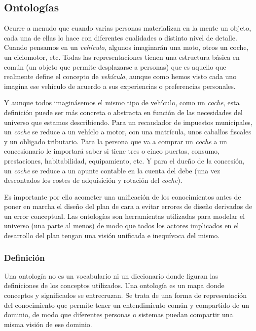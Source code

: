 	\subsection{Ontologías}
  	
	Ocurre a menudo que cuando varias personas materializan en la mente un objeto, cada una de ellas lo hace con diferentes cualidades o distinto nivel de detalle. Cuando pensamos en un \textit{vehículo}, algunos imaginarán una moto, otros un coche, un ciclomotor, etc. Todas las representaciones tienen una estructura básica en común (un objeto que permite desplazarse a personas) que es aquello que realmente define el concepto de \textit{vehículo}, aunque como hemos visto cada uno imagina ese vehículo de acuerdo a sus experiencias o preferencias personales. 
  	
  	Y aunque todos imaginásemos el mismo tipo de vehículo, como un \textit{coche}, esta definición puede ser más concreta o abstracta en función de las necesidades del universo que estamos describiendo. Para un recaudador de impuestos municipales, un \textit{coche} se reduce a un vehíclo a motor, con una matrícula, unos caballos fiscales y un obligado tributario. Para la persona que va a comprar un \textit{coche} a un concesionario le importará saber si tiene tres o cinco puertas, consumo, prestaciones, habitabilidad, equipamiento, etc. Y para el dueño de la concesión, un \textit{coche} se reduce a un apunte contable en la cuenta del debe (una vez descontados los costes de adquisición y rotación del \textit{coche}).
  	
	Es importante por ello acometer una unificación de los conocimientos antes de poner en marcha el diseño del plan de cara a evitar errores de diseño derivados de un error conceptual. Las ontologías son herramientas utilizadas para modelar el universo (una parte al menos) de modo que todos los actores implicados en el desarrollo del plan tengan una visión unificada e inequívoca del mismo.
  	 
		\subsubsection{Definición}
    
		Una ontología no es un vocabulario ni un diccionario donde figuran las definiciones de los conceptos utilizados. Una ontología es un mapa donde conceptos y significados se entrecruzan. Se trata de una forma de representación del conocimiento que permite tener un entendimiento común y compartido de un dominio, de modo que diferentes personas o sistemas puedan compartir una misma visión de ese dominio. 

